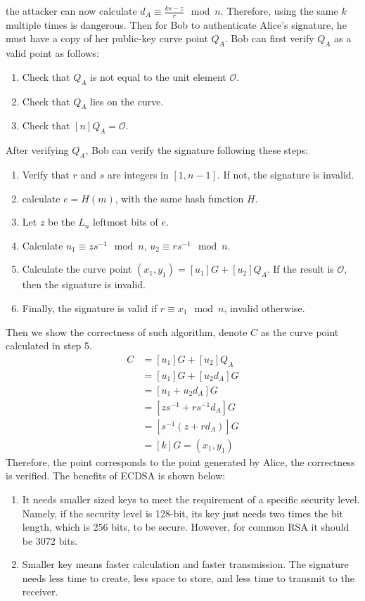 \documentclass[12pt, a4paper]{article}
\begin{document}
the attacker can now calculate $d_A \equiv \frac{ks - z}{r}\mod n$. Therefore, using the same $k$ multiple times is dangerous.\newline
Then for Bob to authenticate Alice's signature, he must have a copy of her public-key curve point $Q_A$. 
Bob can first verify $Q_A$ as a valid point as follows:
\begin{enumerate}
    \item Check that $Q_A$ is not equal to the unit element $\mathcal{O}$.
    \item Check that $Q_A$ lies on the curve.
    \item Check that $[n]Q_A = \mathcal{O}$.
\end{enumerate}
After verifying $Q_A$, Bob can verify the signature following these steps:
\begin{enumerate}
    \item Verify that $r$ and $s$ are integers in $[1,n-1]$. If not, the signature is invalid.
    \item calculate $e = H(m)$, with the same hash function $H$.
    \item Let $z$ be the $L_n$ leftmost bits of $e$.
    \item Calculate $u_1 \equiv zs^{-1}\mod n$, $u_2 \equiv rs^{-1}\mod n$.
    \item Calculate the curve point $(x_1, y_1) = [u_1]G + [u_2]Q_A$. If the result is $\mathcal{O}$, then the signature is invalid.
    \item Finally, the signature is valid if $r\equiv x_1\mod n$, invalid otherwise.
\end{enumerate}
Then we show the correctness of such algorithm, denote $C$ as the curve point calculated in step 5.
\begin{align*}
    C &= [u_1]G + [u_2]Q_A\\
      &= [u_1]G + [u_2d_A]G\\
      &= [u_1 + u_2d_A]G\\
      &= [zs^{-1} + rs^{-1}d_A]G\\
      &= [s^{-1}(z + rd_A)]G\\
      &= [k]G = (x_1, y_1)
\end{align*}
Therefore, the point corresponds to the point generated by Alice, the correctness is verified.\newline
The benefits of ECDSA is shown below:
\begin{enumerate}
    \item It needs smaller sized keys to meet the requirement of a specific security level. Namely, 
          if the security level is 128-bit, its key just needs two times the bit length, which is 256 bits, to be secure. 
          However, for common RSA it should be 3072 bits.
    \item Smaller key means faster calculation and faster transmission. The signature needs less time to create, 
          less space to store, and less time to transmit to the receiver.
\end{enumerate}
\end{document}
